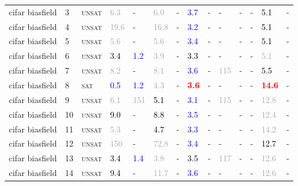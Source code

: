 \begin{center}
{\begin{longtable}{@{}llllllllllllll@{}}
cifar biasfield & 3 & \textsc{unsat} & \textcolor{darkgray}{6.3} & - & \textcolor{darkgray}{6.0} & - & \textcolor{blue}{3.7} & - & - & - & - & \textcolor{black}{5.1} & - \\
cifar biasfield & 4 & \textsc{unsat} & \textcolor{darkgray}{19.6} & - & \textcolor{darkgray}{16.8} & - & \textcolor{blue}{3.2} & - & - & - & - & \textcolor{black}{5.1} & - \\
cifar biasfield & 5 & \textsc{unsat} & \textcolor{darkgray}{5.6} & - & \textcolor{darkgray}{5.6} & - & \textcolor{blue}{3.4} & - & - & - & - & \textcolor{black}{5.1} & - \\
cifar biasfield & 6 & \textsc{unsat} & \textcolor{black}{3.4} & \textcolor{blue}{1.2} & \textcolor{darkgray}{3.9} & - & \textcolor{black}{3.3} & - & - & - & - & \textcolor{darkgray}{5.1} & - \\
cifar biasfield & 7 & \textsc{unsat} & \textcolor{darkgray}{8.2} & - & \textcolor{darkgray}{8.1} & - & \textcolor{blue}{3.6} & - & \textcolor{darkgray}{115} & - & - & \textcolor{black}{5.5} & - \\
cifar biasfield & 8 & \textsc{sat} & \textcolor{blue}{0.5} & \textcolor{blue}{1.2} & \textcolor{darkgray}{4.3} & - & \textbf{\textcolor{red}{3.6}} & - & - & - & - & \textbf{\textcolor{red}{14.6}} & - \\
cifar biasfield & 9 & \textsc{unsat} & \textcolor{darkgray}{6.1} & \textcolor{darkgray}{151} & \textcolor{black}{5.1} & - & \textcolor{blue}{3.1} & - & \textcolor{darkgray}{115} & - & - & \textcolor{darkgray}{12.8} & - \\
cifar biasfield & 10 & \textsc{unsat} & \textcolor{black}{9.0} & - & \textcolor{black}{8.8} & - & \textcolor{blue}{3.5} & - & - & - & - & \textcolor{darkgray}{12.4} & - \\
cifar biasfield & 11 & \textsc{unsat} & \textcolor{darkgray}{5.3} & - & \textcolor{black}{4.7} & - & \textcolor{blue}{3.3} & - & - & - & - & \textcolor{darkgray}{14.2} & - \\
cifar biasfield & 12 & \textsc{unsat} & \textcolor{darkgray}{150} & - & \textcolor{darkgray}{72.8} & - & \textcolor{blue}{3.4} & - & - & - & - & \textcolor{black}{12.7} & - \\
cifar biasfield & 13 & \textsc{unsat} & \textcolor{black}{3.4} & \textcolor{blue}{1.4} & \textcolor{darkgray}{3.8} & - & \textcolor{black}{3.5} & - & \textcolor{darkgray}{117} & - & - & \textcolor{darkgray}{12.6} & - \\
cifar biasfield & 14 & \textsc{unsat} & \textcolor{black}{9.4} & - & \textcolor{darkgray}{11.7} & - & \textcolor{blue}{3.6} & - & - & - & - & \textcolor{darkgray}{12.6} & - \\

\end{longtable}}
\end{center}
